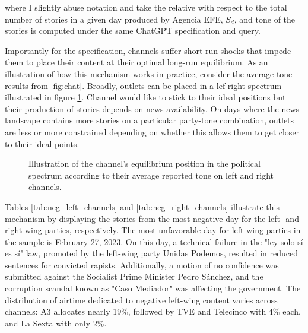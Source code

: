 \documentclass[12pt]{article}
\begin{document}
	
where I slightly abuse notation and take the relative with respect to the total number of stories in a given day produced by Agencia EFE, $S_d$, and tone of the stories is computed under the same ChatGPT specification and query. 

Importantly for the specification, channels suffer short run shocks that impede them to place their content at their optimal long-run equilibrium. As an illustration of how this mechanism works in practice, consider the average tone results from \ref{fig:chat}.  Broadly, outlets can be placed in a lef-right spectrum illustrated in figure \ref{fig:game}. Channel would like to stick to their ideal positions but their production of stories depends on news availability. On days where the news landscape contains more stories on a particular party-tone combination, outlets are less or more constrained depending on whether this allows them to get closer to their ideal points. 

	
	\begin{figure}
		\centering
		\caption{Illustration of the channel's equilibrium position in the political spectrum according to their average reported tone on left and right channels. }
		\label{fig:game}
	\end{figure}
	
Tables \ref{tab:neg_left_channels} and \ref{tab:neg_right_channels} illustrate this mechanism by displaying the stories from the most negative day for the left- and right-wing parties, respectively. The most unfavorable day for left-wing parties in the sample is February 27, 2023. On this day, a technical failure in the "ley solo sí es sí" law, promoted by the left-wing party Unidas Podemos, resulted in reduced sentences for convicted rapists. Additionally, a motion of no confidence was submitted against the Socialist Prime Minister Pedro Sánchez, and the corruption scandal known as "Caso Mediador" was affecting the government. The distribution of airtime dedicated to negative left-wing content varies across channels: A3 allocates nearly 19\%, followed by TVE and Telecinco with 4\% each, and La Sexta with only 2\%.
\end{document}
